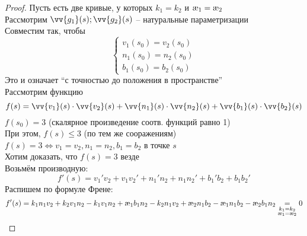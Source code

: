 \begin{proof}
	Пусть есть две кривые, у которых $ k_1 = k_2 $ и $ \text\ae_1 = \text\ae_2 $ \\
	Рассмотрим $ \vv{g_1}(s); \vv{g_2}(s) $ -- натуральные параметризации \\
	Совместим так, чтобы
	$$
	\begin{cases}
		v_1(s_0) = v_2(s_0) \\
		n_1(s_0) = n_2(s_0) \\
		b_1(s_0) = b_2(s_0)
	\end{cases} $$
	Это и означает ``с точностью до положения в пространстве'' \\
	Рассмотрим функцию
	$$ f(s) = \vv{v_1}(s) \cdot \vv{v_2}(s) + \vv{n_1}(s) \cdot \vv{n_2}(s) + \vv{b_1}(s) \cdot \vv{b_2}(s) $$
	$ f(s_0) = 3 $ (скалярное произведение соотв. функций равно 1) \\
	При этом, $ f(s) \le 3 $ (по тем же сооражениям) \\
	$ f(s) = 3 \iff v_1 = v_2, n_1 = n_2, b_1 = b_2 $ в точке $ s $ \\
	Хотим доказать, что $ f(s) = 3 $ везде \\
	Возьмём производную:
	$$ f'(s) = v_1'v_2 + v_1v_2' + n_1'n_2 + n_1n_2' + b_1'b_2 + b_1b_2' $$
	Распишем по формуле Френе:
	$$ f'(s) = k_1n_1v_2 + k_2v_1n_2 - k_1v_1n_2 + \text\ae_1b_1n_2 - k_2n_1v_2 + \text\ae_2n_1b_2 - \text\ae_1n_1b_2 - \text\ae_2b_1n_2 \underset{
		\begin{subarray}{c}
			k_1 = k_2 \\
			\text\ae_1 = \text\ae_2
		\end{subarray}}= 0 $$
\end{proof}
